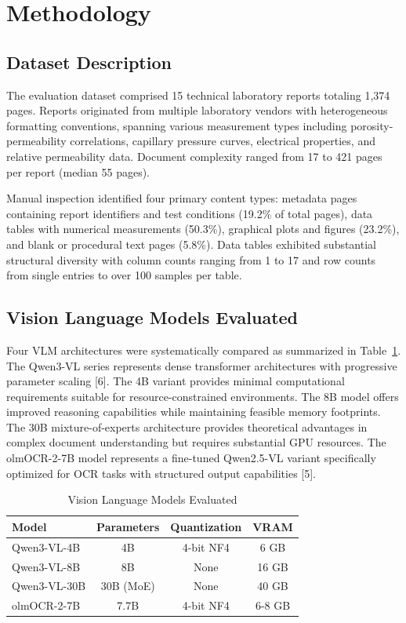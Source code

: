\documentclass{svproc}
\begin{document}
\section{Methodology}

\subsection{Dataset Description}

The evaluation dataset comprised 15 technical laboratory reports totaling 1,374 pages. Reports originated from multiple laboratory vendors with heterogeneous formatting conventions, spanning various measurement types including porosity-permeability correlations, capillary pressure curves, electrical properties, and relative permeability data. Document complexity ranged from 17 to 421 pages per report (median 55 pages).

Manual inspection identified four primary content types: metadata pages containing report identifiers and test conditions (19.2\% of total pages), data tables with numerical measurements (50.3\%), graphical plots and figures (23.2\%), and blank or procedural text pages (5.8\%). Data tables exhibited substantial structural diversity with column counts ranging from 1 to 17 and row counts from single entries to over 100 samples per table.

\subsection{Vision Language Models Evaluated}

Four VLM architectures were systematically compared as summarized in Table~\ref{tab:models}. The Qwen3-VL series represents dense transformer architectures with progressive parameter scaling [6]. The 4B variant provides minimal computational requirements suitable for resource-constrained environments. The 8B model offers improved reasoning capabilities while maintaining feasible memory footprints. The 30B mixture-of-experts architecture provides theoretical advantages in complex document understanding but requires substantial GPU resources. The olmOCR-2-7B model represents a fine-tuned Qwen2.5-VL variant specifically optimized for OCR tasks with structured output capabilities [5].

\begin{table}[htbp]
\caption{Vision Language Models Evaluated}
\label{tab:models}
\begin{center}
\begin{tabular}{lccc}
\toprule
\textbf{Model} & \textbf{Parameters} & \textbf{Quantization} & \textbf{VRAM} \\
\midrule
Qwen3-VL-4B & 4B & 4-bit NF4 & 6 GB \\
Qwen3-VL-8B & 8B & None & 16 GB \\
Qwen3-VL-30B & 30B (MoE) & None & 40 GB \\
olmOCR-2-7B & 7.7B & 4-bit NF4 & 6-8 GB \\
\bottomrule
\end{tabular}
\end{center}
\end{table}
\end{document}
